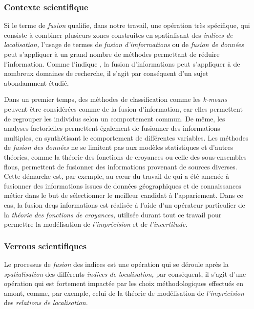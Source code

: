 \subsubsection{Contexte scientifique}

Si le terme de \emph{fusion} qualifie, dans notre travail, une
opération très spécifique, qui consiste à combiner plusieurs zones
construites en spatialisant des \emph{indices de localisation,}
l'usage de termes de \emph{fusion d'imformations} ou de \emph{fusion
  de données} peut s'appliquer à un grand nombre de méthodes
permettant de réduire l'information. Comme l'indique
\textcite{Castanedo2013}, la fusion d'informations peut s'appliquer à
de nombreux domaines de recherche, il s'agit par conséquent d'un sujet
abondamment étudié.

Dans un premier temps, des méthodes de classification comme les
\emph{k-means} peuvent être considérées comme de la fusion
d’information, car elles permettent de regrouper les individus selon
un comportement commun. De même, les analyses factorielles permettent
également de fusionner des informations multiples, en synthétisant le
comportement de différentes variables. Les méthodes de \emph{fusion
  des données} ne se limitent pas aux modèles statistiques et d'autres
théories, comme la théorie des fonctions de croyances ou celle des
sous-ensembles flous, permettent de fusionner des informations
provenant de sources diverses. Cette démarche est, par exemple, au
cœur du travail de \textcite{Olteanu2008} qui a été amenée à fusionner
des informations issues de données géographiques et de connaissances
métier dans le but de sélectionner le meilleur candidat à
l’appariement. Dans ce cas, la fusion deqs informations est réalisée à
l'aide d'un opérateur particulier de la \emph{théorie des fonctions de
  croyances,} utilisée durant tout ce travail pour permettre la
modélisation de \emph{l'imprécision} et de \emph{l'incertitude.}

\subsubsection{Verrous scientifiques}

Le processus de \emph{fusion} des indices est une opération qui se
déroule après la \emph{spatialisation} des différents \emph{indices de
  localisation,} par conséquent, il s'agit d'une opération qui est
fortement impactée par les choix méthodologiques effectués en amont,
comme, par exemple, celui de la théorie de modélisation de
\emph{l'imprécision }des \emph{relations de localisation.}

